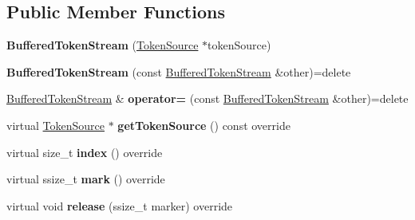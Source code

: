 \subsection*{Public Member Functions}
\begin{DoxyCompactItemize}
\item 
\mbox{\label{classantlr4_1_1BufferedTokenStream_a8745b20dfdbda56d024d3bbd7b1b952b}} 
{\bfseries Buffered\+Token\+Stream} (\hyperlink{classantlr4_1_1TokenSource}{Token\+Source} $\ast$token\+Source)
\item 
\mbox{\label{classantlr4_1_1BufferedTokenStream_aa80d128b76649cb544a2687392b455ba}} 
{\bfseries Buffered\+Token\+Stream} (const \hyperlink{classantlr4_1_1BufferedTokenStream}{Buffered\+Token\+Stream} \&other)=delete
\item 
\mbox{\label{classantlr4_1_1BufferedTokenStream_aa3a4c451709b72c3a1fc3b5e129a0589}} 
\hyperlink{classantlr4_1_1BufferedTokenStream}{Buffered\+Token\+Stream} \& {\bfseries operator=} (const \hyperlink{classantlr4_1_1BufferedTokenStream}{Buffered\+Token\+Stream} \&other)=delete
\item 
\mbox{\label{classantlr4_1_1BufferedTokenStream_adfb641a7c1014a32c25a8de2161d980b}} 
virtual \hyperlink{classantlr4_1_1TokenSource}{Token\+Source} $\ast$ {\bfseries get\+Token\+Source} () const override
\item 
\mbox{\label{classantlr4_1_1BufferedTokenStream_a3df0d36a9f48af46e957287d6f5242a5}} 
virtual size\+\_\+t {\bfseries index} () override
\item 
\mbox{\label{classantlr4_1_1BufferedTokenStream_a04ae6c5de3677e6836f162655c710a22}} 
virtual ssize\+\_\+t {\bfseries mark} () override
\item 
\mbox{\label{classantlr4_1_1BufferedTokenStream_af881ee9a58087055bc33c4d8ca2f64e7}} 
virtual void {\bfseries release} (ssize\+\_\+t marker) override
\item 
\mbox{\label{classantlr4_1_1BufferedTokenStream_a258dec8c7d9d2cf5ee0b69105cfab9e4}} 

\end{DoxyCompactItemize}
